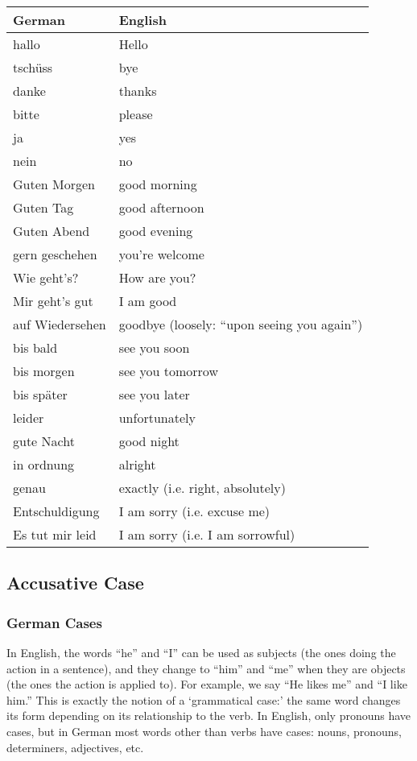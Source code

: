 \begin{center}\begin{tabular}{l|l}
  \textbf{German} & \textbf{English} \\
	\hline
	hallo & Hello \\
	tsch{\"u}ss & bye \\
	danke & thanks \\
	bitte & please \\
	ja & yes \\
	nein & no \\
	Guten Morgen & good morning \\
	Guten Tag & good afternoon \\
	Guten Abend & good evening \\
	gern geschehen & you're welcome \\
	Wie geht's? & How are you? \\
	Mir geht's gut & I am good \\
	auf Wiedersehen & goodbye (loosely: ``upon seeing you again'') \\
	bis bald & see you soon \\
	bis morgen & see you tomorrow \\
	bis sp{\"a}ter & see you later \\
	leider & unfortunately \\
	gute Nacht & good night \\
	in ordnung & alright \\
	genau & exactly (i.e. right, absolutely) \\
	Entschuldigung & I am sorry (i.e. excuse me) \\
	Es tut mir leid & I am sorry (i.e. I am sorrowful)
\end{tabular}\end{center}


\pagebreak
\subsection{Accusative Case}

\subsubsection{German Cases}

In English, the words ``he'' and ``I'' can be used as subjects (the ones doing the action in a sentence), and they change to ``him'' and ``me'' when they are objects (the ones the action is applied to). For example, we say ``He likes me'' and ``I like him.'' This is exactly the notion of a `grammatical case:' the same word changes its form depending on its relationship to the verb. In English, only pronouns have cases, but in German most words other than verbs have cases: nouns, pronouns, determiners, adjectives, etc.

